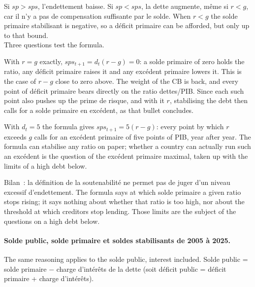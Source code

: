Si $sp > sps$, l'endettement baisse. Si $sp < sps$, la dette augmente, même si
$r < g$, car il n'y a pas de compensation suffisante par le solde. When
$r < g$ the solde primaire stabilisant is negative, so a déficit primaire can
be afforded, but only up to that bound.\\

Three questions test the formula.

\begin{example}[Si $r = g$~?]
  With $r = g$ exactly, $sps_{t+1} = d_t(r - g) = 0$: a solde primaire of zero
  holds the ratio, any déficit primaire raises it and any excédent primaire
  lowers it. This is the case of $r - g$ close to zero above. The weight of the
  CB is back, and every point of déficit primaire bears directly on the ratio
  dettes/PIB. Since each such point also pushes up the prime de risque, and with
  it $r$, stabilising the debt then calls for a solde primaire en excédent, as
  that bullet concludes.
\end{example}

\begin{example}
  With $d_t = 5$ the formula gives $sps_{t+1} = 5(r - g)$: every point by which
  $r$ exceeds $g$ calls for an excédent primaire of five points of PIB, year after
  year. The formula can stabilise any ratio on paper; whether a country can
  actually run such an excédent is the question of the excédent primaire
  maximal, taken up with the limits of a high debt below.
\end{example}

\begin{example}
  Bilan~: la définition de la soutenabilité ne permet pas de juger d'un niveau
  excessif d'endettement. The formula says at which solde primaire a given
  ratio stops rising; it says nothing about whether that ratio is too high,
  nor about the threshold at which creditors stop lending. Those limits are the
  subject of the questions on a high debt below.
\end{example}

\paragraph{Solde public, solde primaire et soldes stabilisants de 2005 à 2025.}
The same reasoning applies to the solde public, interest included. Solde
public = solde primaire $-$ charge d'intérêts de la dette (soit déficit public =
déficit primaire + charge d'intérêts).

